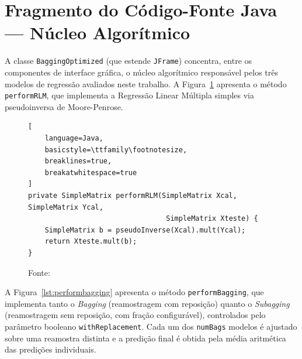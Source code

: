 \section{Fragmento do Código-Fonte Java --- Núcleo Algorítmico}
\label{sec:codigo_java_nucleo}

A classe \texttt{BaggingOptimized} (que estende \texttt{JFrame}) concentra, entre
os componentes de interface gráfica, o núcleo algorítmico responsável pelos três
modelos de regressão avaliados neste trabalho. A Figura~\ref{lst:performrlm}
apresenta o método \texttt{performRLM}, que implementa a Regressão Linear
Múltipla simples via pseudoinversa de Moore-Penrose.


\begin{figure}[H]
\centering
\caption{Regressão Linear Múltipla via pseudoinversa (\texttt{BaggingOptimized.java}).}
\label{lst:performrlm}
\begin{lstlisting}[
    language=Java, 
    basicstyle=\ttfamily\footnotesize,
    breaklines=true,
    breakatwhitespace=true
]
private SimpleMatrix performRLM(SimpleMatrix Xcal, SimpleMatrix Ycal,
                                 SimpleMatrix Xteste) {
    SimpleMatrix b = pseudoInverse(Xcal).mult(Ycal);
    return Xteste.mult(b);
}
\end{lstlisting}
\caption*{Fonte: \oautor}
\end{figure}


A Figura~\ref{lst:performbagging} apresenta o método \texttt{performBagging},
que implementa tanto o \textit{Bagging} (reamostragem com reposição) quanto o
\textit{Subagging} (reamostragem sem reposição, com fração configurável),
controlados pelo parâmetro booleano \texttt{withReplacement}. Cada um dos
\texttt{numBags} modelos é ajustado sobre uma reamostra distinta e a predição
final é obtida pela média aritmética das predições individuais.

